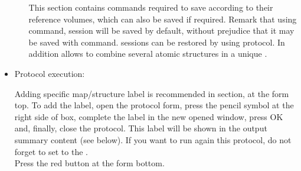 \begin{itemize}
\begin{itemize}
    This section contains \chimera commands required to save  according to their reference volumes, which can also be saved if required. Remark that using  command, \chimera session will be saved by default, without prejudice that it may be saved with  command. \chimera sessions can be restored by using  protocol. In addition  allows to combine several atomic structures in a unique .
    
    \end{itemize}

  \item Protocol execution:
  
  Adding specific map/structure label is recommended in  section, at the form top. To add the label, open the protocol form, press the pencil symbol at the right side of  box, complete the label in the new opened window, press OK and, finally, close the protocol. This label will be shown in the output summary content (see below). If you want to run again this protocol, do not forget to set to  the .\\
  Press the  red button at the form bottom.\\
  

\end{itemize}
